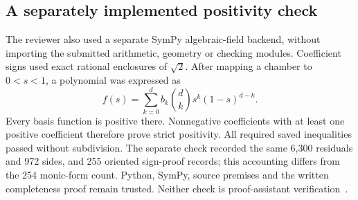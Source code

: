 \documentclass[11pt,a4paper]{article}
\theoremstyle{definition}
\begin{document}
\subsection{A separately implemented positivity check}\label{sec:bernstein}
The reviewer also used a separate SymPy algebraic-field backend, without importing the submitted arithmetic, geometry or checking modules. Coefficient signs used exact rational enclosures of $\sqrt2$. After mapping a chamber to $0<s<1$, a polynomial was expressed as
\begin{equation}\label{eq:bernstein}
f(s)=\sum_{k=0}^{d} b_k\binom{d}{k}s^k(1-s)^{d-k}.
\end{equation}
Every basis function is positive there. Nonnegative coefficients with at least one positive coefficient therefore prove strict positivity. All required saved inequalities passed without subdivision. The separate check recorded the same 6,300 residuals and 972 sides, and 255 oriented sign-proof records; this accounting differs from the 254 monic-form count. Python, SymPy, source premises and the written completeness proof remain trusted. Neither check is proof-assistant verification~\cite[Section 4.3]{review}.

\clearpage
\end{document}
